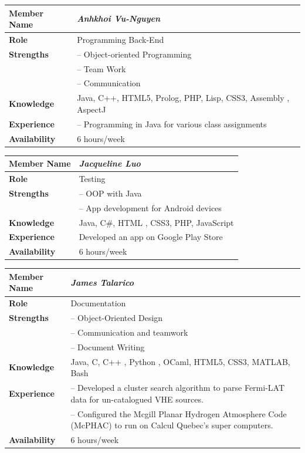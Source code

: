 \documentclass[12pt]{article}
\begin{document}
%
\begin{center}
\begin{tabular}{ p{2.7cm} | p{9cm} }
\hline
\textbf{Member Name}	&	\textit{\textbf{Anhkhoi Vu-Nguyen}}	\\ \hline \hline
\textbf{Role}		&	Programming Back-End	\\ \hline
\textbf{Strengths}	&	-- Object-oriented Programming	\\
					&	-- Team Work	\\
					&	-- Communication	\\ \hline
\textbf{Knowledge}	&	Java, C++, HTML5, Prolog, PHP, Lisp, CSS3, Assembly , AspectJ	\\ \hline
\textbf{Experience}	&	-- Programming in Java for various class assignments 	\\ \hline
\textbf{Availability}	&	6 hours/week	\\ \hline
\end{tabular}
\end{center}
%
\vspace{3mm}
%
\begin{center}
\begin{tabular}{ p{2.7cm} | p{9cm} }
\hline
\textbf{Member Name}	&	\textit{\textbf{Jacqueline Luo}}	\\ \hline \hline
\textbf{Role}		&	Testing	\\ \hline
\textbf{Strengths}	&	-- OOP with Java	\\
					&	-- App development for Android devices	\\ \hline
\textbf{Knowledge}	&	Java, C\#, HTML , CSS3, PHP, JavaScript	\\ \hline
\textbf{Experience}	&	Developed an app on Google Play Store	\\ \hline
\textbf{Availability}	&	6 hours/week	\\ \hline
\end{tabular}
\end{center}
%
\vspace{3mm}
%
\begin{center}
\begin{tabular}{ p{2.7cm} | p{9cm} }
\hline
\textbf{Member Name}	&	\textit{\textbf{James Talarico}}	\\ \hline \hline
\textbf{Role}		&	Documentation	\\ \hline
\textbf{Strengths}	&	-- Object-Oriented Design	\\
					&	-- Communication and teamwork	\\
					&	-- Document Writing	\\ \hline
\textbf{Knowledge}	&	Java, C, C++ , Python , OCaml, HTML5, CSS3, MATLAB, Bash	\\ \hline
\textbf{Experience}	&	-- Developed a cluster search algorithm to parse Fermi-LAT data for un-catalogued VHE sources.	\\
					&	-- Configured the Mcgill Planar Hydrogen Atmosphere Code (McPHAC) to run on Calcul Quebec's super computers.	\\ \hline
\textbf{Availability}	&	6 hours/week	\\ \hline
\end{tabular}
\end{center}
\end{document}
